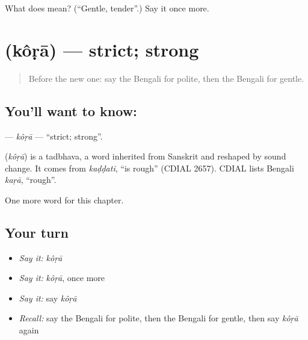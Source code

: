 \begin{tcolorbox}[breakable,colback=teal!4,colframe=teal!35!black,title={Before you move on}]
What does  mean? (\textquotedblleft{}Gentle, tender\textquotedblright{}.) Say it once more.
\end{tcolorbox}
\section[\texorpdfstring{\bn{কড়া} (kôṛā)}{কড়া (kôṛā)}]{ (kôṛā) — strict; strong}

\label{lesson:BN-C161-kora}



\begin{quote}
Before the new one: say the Bengali for polite, then the Bengali for gentle.
\end{quote}

\subsection*{You'll want to know: }
\textbf{} — \emph{kôṛā} — \textquotedblleft{}strict; strong\textquotedblright{}.

\begin{cousinweb}
\textbf{} (\emph{kôṛā}) is a tadbhava, a word inherited from Sanskrit and reshaped by sound change. It comes from \emph{kaḍḍati}, \textquotedblleft{}is rough\textquotedblright{} (CDIAL 2657). CDIAL lists Bengali \emph{kaṛā}, \textquotedblleft{}rough\textquotedblright{}.
\end{cousinweb}

\begin{grammarlens}[title={What you've built}]
One more word for this chapter.
\end{grammarlens}

\subsection*{Your turn}
\begin{itemize}
\raggedright
  \item \emph{Say it:} \emph{kôṛā}
  \item \emph{Say it:} \emph{kôṛā}, once more
  \item \emph{Say it:} say \emph{kôṛā}
  \item \emph{Recall:} say the Bengali for polite, then the Bengali for gentle, then say \emph{kôṛā} again
\end{itemize}


